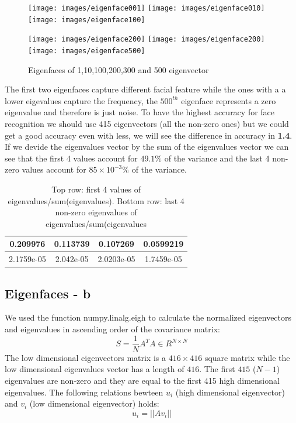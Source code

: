 \documentclass[10pt,twocolumn,letterpaper]{article}
\begin{document}
\begin{figure}[h]
    \centering
    \texttt{[image: images/eigenface001]} 
    \texttt{[image: images/eigenface010]}
    \texttt{[image: images/eigenface100]}
    
    \texttt{[image: images/eigenface200]}
    \texttt{[image: images/eigenface200]}
    \texttt{[image: images/eigenface500]}
    \caption{Eigenfaces of 1,10,100,200,300 and 500 eigenvector}
    \label{fig:eigenfaces}
\end{figure}
The first two eigenfaces capture different facial feature while the ones with a a lower eigevalues capture the frequency, the $500^{th}$  eigenface represents a zero eigenvalue and therefore is just noise. To have the highest accuracy for face recognition we should use 415 eigenvectors (all the non-zero ones) but we could get a good accuracy even with less, we will see the difference in accuracy in \textbf{1.4}. If we devide the eigenvalues vector by the sum of the eigenvalues vector we can see that the first 4 values account for $49.1\%$ of the variance and the last 4 non-zero values account for $85\times 10^{-3}\%$ of the variance.
\begin{table}[h]
    \centering
    \begin{tabular}{|c|c|c|c|}
        \hline
        0.209976    & 0.113739   & 0.107269    & 0.0599219   \\ \hline
        2.1759e-05 & 2.042e-05 & 2.0203e-05 & 1.7459e-05 \\ \hline
    \end{tabular}
    \vspace{2.00mm}
    \caption{Top row: first 4 values of eigenvalues/sum(eigenvalues). Bottom row: last 4 non-zero eigenvalues of eigenvalues/sum(eigenvalues}
    \label{tab:eigenfacesvalue}
\end{table}

\subsection{Eigenfaces - b}

We used the function numpy.linalg.eigh to calculate the normalized eigenvectors and eigenvalues in ascending order of the covariance matrix:
\begin{equation}
    S = \frac{1}{N}A^TA \in R^{N\times N}
\end{equation}
The low dimensional eigenvectors matrix is a $416\times 416$ square matrix while the low dimensional eigenvalues vector has a length of $416$. The first $415$ ($N-1$) eigenvalues are non-zero and they are equal to the first 415 high dimensional eigenvalues. The following relations bewteen $u_i$ (high dimensional eigenvector) and $v_i$ (low dimensional eigenvector) holds:
\begin{equation}
    u_i = ||Av_i||
\end{equation}
\end{document}
